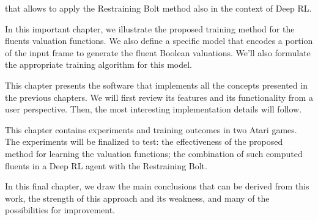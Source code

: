 \begin{description}[style=nextline]
		that allows to apply the Restraining Bolt method also in the context of
		Deep RL.
	\item[\ref{ch:fluents}~--~\nameref{ch:fluents}]
		In this important chapter, we illustrate the proposed training method for
		the fluents valuation functions. We also define a specific model that
		encodes a portion of the input frame to generate the fluent Boolean
		valuations.  We'll also formulate the appropriate training algorithm for
		this model.
	\item[\ref{ch:atarieyes}~--~\nameref{ch:atarieyes}]
		This chapter presents the software that implements all the concepts
		presented in the previous chapters. We will first review its features and
		its functionality from a user perspective. Then, the most interesting
		implementation details will follow.
	\item[\ref{ch:experiments}~--~\nameref{ch:experiments}]
		This chapter contains experiments and training outcomes in two Atari
		games. The experiments will be finalized to test: the effectiveness of the
		proposed method for learning the valuation functions; the combination of
		such computed fluents in a Deep RL agent with the Restraining Bolt.
	\item[\ref{ch:conclusions}~--~\nameref{ch:conclusions}]
		In this final chapter, we draw the main conclusions that can be derived
		from this work, the strength of this approach and its weakness, and many
		of the possibilities for improvement.
\end{description}

